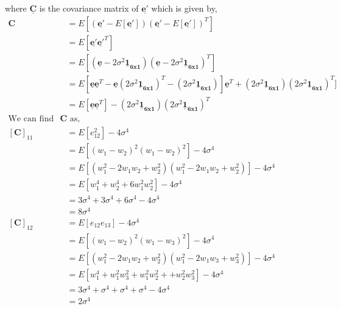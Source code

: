 \documentclass[a4 paper]{article}
\begin{document}
where $\mathbf{\underline{C}}$ is the covariance matrix of $\mathbf{\underline{e'}}$ which is given by,
\begin{align*}
	\mathbf{C} &= E[(\mathbf{\underline{e'}}-E[\mathbf{\underline{e'}}])(\mathbf{\underline{e'}}-E[\mathbf{\underline{e'}}])^{T}]
	\\ &= E[\mathbf{\underline{e'}}\mathbf{\underline{e'}}^{T}]
	\\ &= E[(\mathbf{\underline{e}}-2\sigma^{2}\mathbf{\underline{1}_{6x1}})(\mathbf{\underline{e}}-2\sigma^{2}\mathbf{\underline{1}_{6x1}})^{T}]
	\\ &= E[\mathbf{\underline{e}}\mathbf{\underline{e}}^{T} - \mathbf{\underline{e}}(2\sigma^{2}\mathbf{\underline{1}_{6x1}})^{T}- (2\sigma^{2}\mathbf{\underline{1}_{6x1}})]\mathbf{\underline{e}}^{T} + (2\sigma^{2}\mathbf{\underline{1}_{6x1}})(2\sigma^{2}\mathbf{\underline{1}_{6x1}})^{T}]
	\\ &= E[\mathbf{\underline{e}}\mathbf{\underline{e}}^{T}] - (2\sigma^{2}\mathbf{\underline{1}_{6x1}})(2\sigma^{2}\mathbf{\underline{1}_{6x1}})^{T}
\\ \text{We can find element by element of $\mathbf{C}$ as,}
\\ [\mathbf{C}]_{11} &= E[e_{12}^{2}] -4\sigma^{4}
\\ &= E[(w_{1}-w_{2})^{2}(w_{1}-w_{2})^{2}] -4\sigma^{4}
\\ &= E[(w_{1}^{2}-2w_{1}w_{2}+w_{2}^{2})(w_{1}^{2}-2w_{1}w_{2}+w_{2}^{2})] -4\sigma^{4}
\\ &= E[w_{1}^{4}+w_{2}^{4}+6w_{1}^{2}w_{2}^{2}]  -4\sigma^{4}
\\ &= 3\sigma^{4}+3\sigma^{4}+6\sigma^{4} -4\sigma^{4}
\\ &= 8\sigma^{4}
\\ [\mathbf{C}]_{12} &= E[e_{12}e_{13}] -4\sigma^{4}
\\ &= E[(w_{1}-w_{2})^{2}(w_{1}-w_{3})^{2}] -4\sigma^{4}
\\ &= E[(w_{1}^{2}-2w_{1}w_{2}+w_{2}^{2})(w_{1}^{2}-2w_{1}w_{3}+w_{3}^{2})] -4\sigma^{4}
\\ &= E[w_{1}^{4}+w_{1}^{2}w_{3}^{2}+w_{1}^{2}w_{2}^{2}++w_{2}^{2}w_{3}^{2}]  -4\sigma^{4}
\\ &= 3\sigma^{4}+\sigma^{4}+\sigma^{4}+\sigma^{4} -4\sigma^{4}
\\ &= 2\sigma^{4}

\end{align*}
\end{document}
